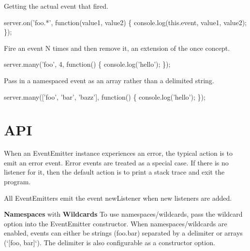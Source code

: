 \begin{DoxyItemize}
\item Getting the actual event that fired.
\end{DoxyItemize}


\begin{DoxyCode}
server.on('foo.*', function(value1, value2) \{
  console.log(this.event, value1, value2);
\});
\end{DoxyCode}



\begin{DoxyItemize}
\item Fire an event N times and then remove it, an extension of the {\ttfamily once} concept.
\end{DoxyItemize}


\begin{DoxyCode}
server.many('foo', 4, function() \{
  console.log('hello');
\});
\end{DoxyCode}



\begin{DoxyItemize}
\item Pass in a namespaced event as an array rather than a delimited string.
\end{DoxyItemize}


\begin{DoxyCode}
server.many(['foo', 'bar', 'bazz'], function() \{
  console.log('hello');
\});
\end{DoxyCode}


\section*{A\+PI}

When an {\ttfamily Event\+Emitter} instance experiences an error, the typical action is to emit an {\ttfamily error} event. Error events are treated as a special case. If there is no listener for it, then the default action is to print a stack trace and exit the program.

All Event\+Emitters emit the event {\ttfamily new\+Listener} when new listeners are added.

{\bfseries Namespaces} with {\bfseries Wildcards} To use namespaces/wildcards, pass the {\ttfamily wildcard} option into the Event\+Emitter constructor. When namespaces/wildcards are enabled, events can either be strings ({\ttfamily foo.\+bar}) separated by a delimiter or arrays (`\mbox{[}\textquotesingle{}foo\textquotesingle{}, \textquotesingle{}bar\textquotesingle{}\mbox{]}`). The delimiter is also configurable as a constructor option.

